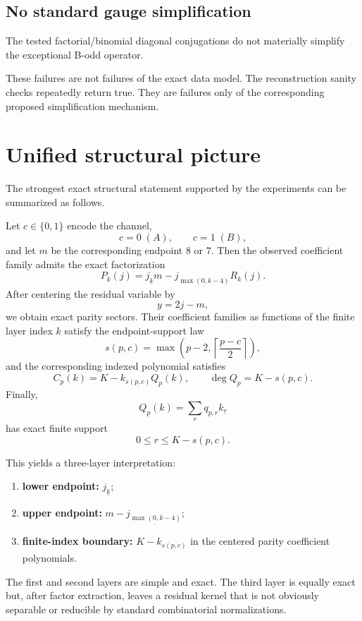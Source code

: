 \documentclass[11pt,a4paper]{article}
\newcommand{\fall}[2]{#1_{\underline{#2}}}
\newcommand{\ceil}[1]{\left\lceil #1 \right\rceil}
\begin{document}
\subsection{No standard gauge simplification}
The tested factorial/binomial diagonal conjugations do not materially simplify the exceptional B-odd operator.

These failures are not failures of the exact data model.  The reconstruction sanity checks repeatedly return true.  They are failures only of the corresponding proposed simplification mechanism.

\section{Unified structural picture}

The strongest exact structural statement supported by the experiments can be summarized as follows.

Let $c\in\{0,1\}$ encode the channel,
\[
c=0\;(A),\qquad c=1\;(B),
\]
and let $m$ be the corresponding endpoint $8$ or $7$.  Then the observed coefficient family admits the exact factorization
\begin{equation}
\label{eq:master}
P_k(j)=\fall{j}{k}\fall{m-j}{\max(0,k-4)}R_k(j).
\end{equation}
After centering the residual variable by
\[
y=2j-m,
\]
we obtain exact parity sectors.  Their coefficient families as functions of the finite layer index $k$ satisfy the endpoint-support law
\begin{equation}
\label{eq:master-support}
s(p,c)=\max\!\left(p-2,\ceil{\frac{p-c}{2}}\right),
\end{equation}
and the corresponding indexed polynomial satisfies
\begin{equation}
\label{eq:master-index}
C_p(k)=\fall{K-k}{s(p,c)}Q_p(k),
\qquad \deg Q_p=K-s(p,c).
\end{equation}
Finally,
\begin{equation}
\label{eq:master-second}
Q_p(k)=\sum_rq_{p,r}\fall{k}{r}
\end{equation}
has exact finite support
\[
0\le r\le K-s(p,c).
\]

This yields a three-layer interpretation:
\begin{enumerate}
  \item \textbf{lower endpoint:} $\fall{j}{k}$;
  \item \textbf{upper endpoint:} $\fall{m-j}{\max(0,k-4)}$;
  \item \textbf{finite-index boundary:} $\fall{K-k}{s(p,c)}$ in the centered parity coefficient polynomials.
\end{enumerate}
The first and second layers are simple and exact.  The third layer is equally exact but, after factor extraction, leaves a residual kernel that is not obviously separable or reducible by standard combinatorial normalizations.
\end{document}
